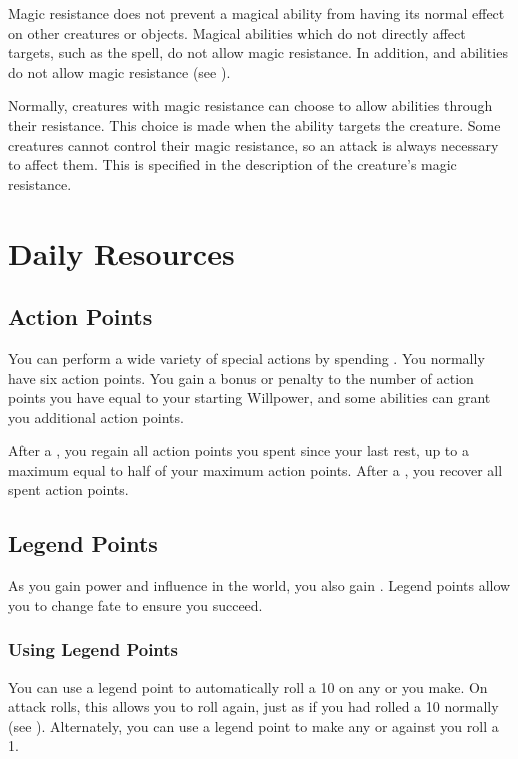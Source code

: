         Magic resistance does not prevent a magical ability from having its normal effect on other creatures or objects.
        Magical abilities which do not directly affect targets, such as the  spell, do not allow magic resistance.
        In addition,  and  abilities do not allow magic resistance (see ).

        Normally, creatures with magic resistance can choose to allow abilities through their resistance.
        This choice is made when the ability targets the creature.
        Some creatures cannot control their magic resistance, so an attack is always necessary to affect them.
        This is specified in the description of the creature's magic resistance.

\section{Daily Resources}

    \subsection{Action Points}\label{Action Points}
        You can perform a wide variety of special actions by spending .
        You normally have six action points.
        You gain a bonus or penalty to the number of action points you have equal to your starting Willpower, and some abilities can grant you additional action points.

        After a , you regain all action points you spent since your last rest, up to a maximum equal to half of your maximum action points.
        After a , you recover all spent action points.

    \subsection{Legend Points}\label{Legend Points}

        As you gain power and influence in the world, you also gain .
        Legend points allow you to change fate to ensure you succeed.

        \subsubsection{Using Legend Points}
            You can use a legend point to automatically roll a 10 on any  or  you make.
            On attack rolls, this allows you to roll again, just as if you had rolled a 10 normally (see ).
            Alternately, you can use a legend point to make any  or  against you roll a 1.

